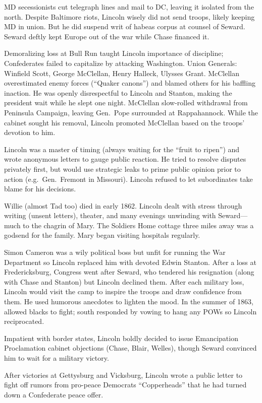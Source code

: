 \documentclass[
]{article}
\begin{document}
MD secessionists cut telegraph lines and mail to DC, leaving it isolated
from the north. Despite Baltimore riots, Lincoln wisely did not send
troops, likely keeping MD in union. But he did suspend writ of habeas
corpus at counsel of Seward. Seward deftly kept Europe out of the war
while Chase financed it.

Demoralizing loss at Bull Run taught Lincoln importance of discipline;
Confederates failed to capitalize by attacking Washington. Union
Generals: Winfield Scott, George McClellan, Henry Halleck, Ulysses
Grant. McClellan overestimated enemy forces (``Quaker canons'') and
blamed others for his baffling inaction. He was openly disrespectful to
Lincoln and Stanton, making the president wait while he slept one night.
McClellan slow-rolled withdrawal from Peninsula Campaign, leaving
Gen.~Pope surrounded at Rappahannock. While the cabinet sought his
removal, Lincoln promoted McClellan based on the troops' devotion to
him.

Lincoln was a master of timing (always waiting for the ``fruit to
ripen'') and wrote anonymous letters to gauge public reaction. He tried
to resolve disputes privately first, but would use strategic leaks to
prime public opinion prior to action (e.g.~Gen.~Fremont in Missouri).
Lincoln refused to let subordinates take blame for his decisions.

Willie (almost Tad too) died in early 1862. Lincoln dealt with stress
through writing (unsent letters), theater, and many evenings unwinding
with Seward---much to the chagrin of Mary. The Soldiers Home cottage
three miles away was a godsend for the family. Mary began visiting
hospitals regularly.

Simon Cameron was a wily political boss but unfit for running the War
Department so Lincoln replaced him with devoted Edwin Stanton. After a
loss at Fredericksburg, Congress went after Seward, who tendered his
resignation (along with Chase and Stanton) but Lincoln declined them.
After each military loss, Lincoln would visit the camp to inspire the
troops and draw confidence from them. He used humorous anecdotes to
lighten the mood. In the summer of 1863, allowed blacks to fight; south
responded by vowing to hang any POWs so Lincoln reciprocated.

Impatient with border states, Lincoln boldly decided to issue
Emancipation Proclamation cabinet objections (Chase, Blair, Welles),
though Seward convinced him to wait for a military victory.

After victories at Gettysburg and Vicksburg, Lincoln wrote a public
letter to fight off rumors from pro-peace Democrats ``Copperheads'' that
he had turned down a Confederate peace offer.
\end{document}
